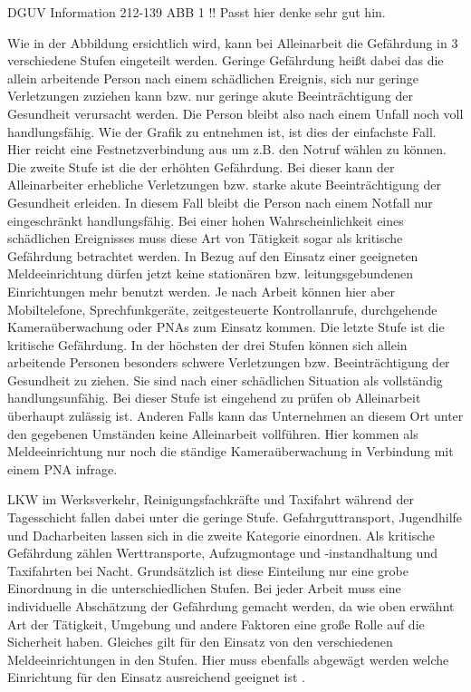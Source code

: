 \documentclass[thesis.tex]{subfiles}
\begin{document}
DGUV Information 212-139 ABB 1 !! Passt hier denke sehr gut hin.

Wie in der Abbildung ersichtlich wird, kann bei Alleinarbeit die Gefährdung in 3 verschiedene Stufen eingeteilt werden.
Geringe Gefährdung heißt dabei das die allein arbeitende Person nach einem schädlichen Ereignis, sich nur geringe Verletzungen zuziehen kann bzw. nur geringe akute Beeinträchtigung der Gesundheit verursacht werden.
Die Person bleibt also nach einem Unfall noch voll handlungsfähig.
Wie der Grafik zu entnehmen ist, ist dies der einfachste Fall.
Hier reicht eine Festnetzverbindung aus um z.B. den Notruf wählen zu können.
Die zweite Stufe ist die der erhöhten Gefährdung.
Bei dieser kann der Alleinarbeiter erhebliche Verletzungen bzw. starke akute Beeinträchtigung der Gesundheit erleiden.
In diesem Fall bleibt die Person nach einem Notfall nur eingeschränkt handlungsfähig.
Bei einer hohen Wahrscheinlichkeit eines schädlichen Ereignisses muss diese Art von Tätigkeit sogar als kritische Gefährdung betrachtet werden.
In Bezug auf den Einsatz einer geeigneten Meldeeinrichtung dürfen jetzt keine stationären bzw. leitungsgebundenen Einrichtungen mehr benutzt werden.
Je nach Arbeit können hier aber Mobiltelefone, Sprechfunkgeräte, zeitgesteuerte Kontrollanrufe, durchgehende Kameraüberwachung oder PNAs zum Einsatz kommen.
Die letzte Stufe ist die kritische Gefährdung.
In der höchsten der drei Stufen können sich allein arbeitende Personen besonders schwere Verletzungen bzw. Beeinträchtigung der Gesundheit zu ziehen.
Sie sind nach einer schädlichen Situation als vollständig handlungsunfähig.
Bei dieser Stufe ist eingehend zu prüfen ob Alleinarbeit überhaupt zulässig ist.
Anderen Falls kann das Unternehmen an diesem Ort unter den gegebenen Umständen keine Alleinarbeit vollführen.
Hier kommen als Meldeeinrichtung nur noch die ständige Kameraüberwachung in Verbindung mit einem PNA infrage.

LKW im Werksverkehr, Reinigungsfachkräfte und Taxifahrt während der Tagesschicht fallen dabei unter die geringe Stufe.
Gefahrguttransport, Jugendhilfe und Dacharbeiten lassen sich in die zweite Kategorie einordnen.
Als kritische Gefährdung zählen Werttransporte, Aufzugmontage und -instandhaltung und Taxifahrten bei Nacht.
Grundsätzlich ist diese Einteilung nur eine grobe Einordnung in die unterschiedlichen Stufen.
Bei jeder Arbeit muss eine individuelle Abschätzung der Gefährdung gemacht werden, da wie oben erwähnt Art der Tätigkeit, Umgebung und andere Faktoren eine große Rolle auf die Sicherheit haben.
Gleiches gilt für den Einsatz von den verschiedenen Meldeeinrichtungen in den Stufen.
Hier muss ebenfalls abgewägt werden welche Einrichtung für den Einsatz ausreichend geeignet ist \cite[vgl. S.7-9]{Information_212-139}.
\end{document}
